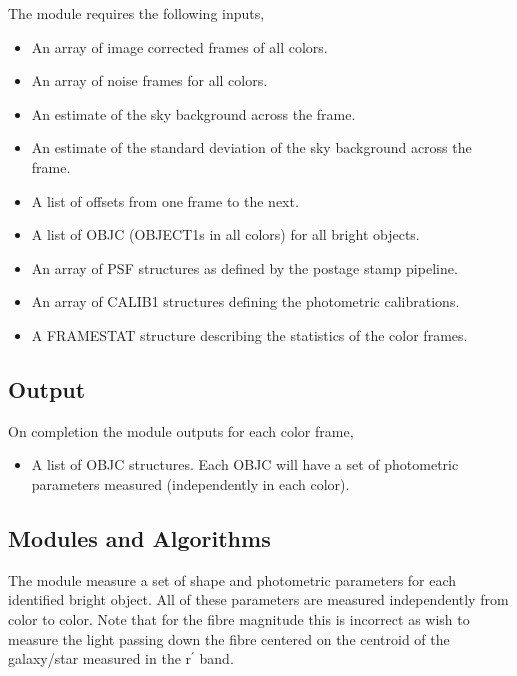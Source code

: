 The \bom module requires the following inputs,
 
\begin{itemize}
 
\item An array of image corrected frames of all colors.
 
\item An array of noise frames for all colors.
 
\item An estimate of the sky background across the frame.  
 
\item An estimate of the standard deviation of the sky background
across the frame.  
 
\item A list of offsets from one frame to the next.
 
\item A list of OBJC (OBJECT1s in all colors) for all bright objects.
 
\item An array of PSF structures as defined by the postage stamp pipeline.
 
\item An array of CALIB1 structures defining the photometric calibrations.
 
\item A FRAMESTAT structure describing the statistics of the color frames.
 
\end{itemize}
 
\subsection{Output}
 
On completion the \bom module outputs for each color frame,
 
\begin{itemize}
 
\item A list of OBJC structures. Each OBJC will have a set of
photometric parameters measured (independently in each color).
 
\end{itemize}
 
\subsection{Modules and Algorithms}
 
The \bom module measure a set of shape and photometric parameters for
each identified bright object. All of these parameters are measured
independently from color to color. Note that for the fibre magnitude
this is incorrect as wish to measure the light passing down the fibre
centered on the centroid of the galaxy/star measured in the r$^\prime$
band.
 
